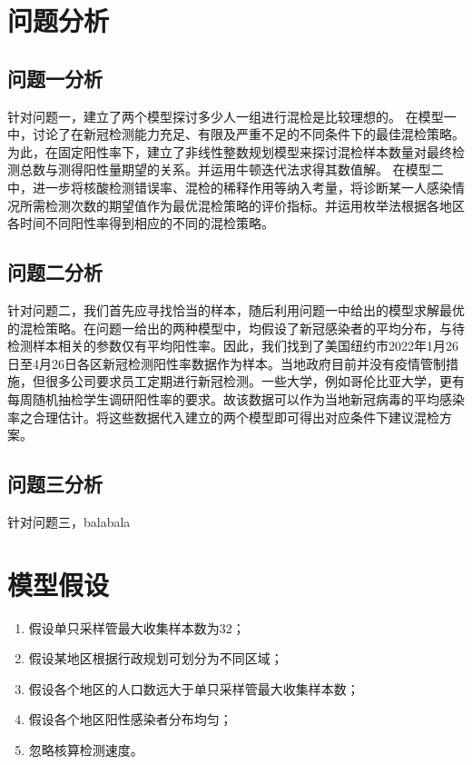 \documentclass[withoutpreface,bwprint]{cumcmthesis} %
\begin{document}
\section{问题分析}
\subsection{问题一分析}
针对问题一，建立了两个模型探讨多少人一组进行混检是比较理想的。
在模型一中，讨论了在新冠检测能力充足、有限及严重不足的不同条件下的最佳混检策略。为此，在固定阳性率下，建立了非线性整数规划模型来探讨混检样本数量对最终检测总数与测得阳性量期望的关系。并运用牛顿迭代法求得其数值解。
在模型二中，进一步将核酸检测错误率、混检的稀释作用等纳入考量，将诊断某一人感染情况所需检测次数的期望值作为最优混检策略的评价指标。并运用枚举法根据各地区各时间不同阳性率得到相应的不同的混检策略。

\subsection{问题二分析}
针对问题二，我们首先应寻找恰当的样本，随后利用问题一中给出的模型求解最优的混检策略。在问题一给出的两种模型中，均假设了新冠感染者的平均分布，与待检测样本相关的参数仅有平均阳性率。因此，我们找到了美国纽约市2022年1月26日至4月26日各区新冠检测阳性率数据作为样本。当地政府目前并没有疫情管制措施，但很多公司要求员工定期进行新冠检测。一些大学，例如哥伦比亚大学，更有每周随机抽检学生调研阳性率的要求\cite{columbia}。故该数据可以作为当地新冠病毒的平均感染率之合理估计。将这些数据代入建立的两个模型即可得出对应条件下建议混检方案。

\subsection{问题三分析}%
针对问题三，balabala
\section{模型假设}
\begin{enumerate}
    \item 假设单只采样管最大收集样本数为32\cite{max_maps}；
    \item 假设某地区根据行政规划可划分为不同区域；
    \item 假设各个地区的人口数远大于单只采样管最大收集样本数；
    \item 假设各个地区阳性感染者分布均匀；
    \item 忽略核算检测速度。
\end{enumerate}
\end{document}
